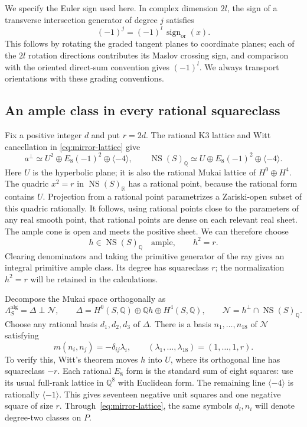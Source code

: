 \documentclass[11pt]{article}
\numberwithin{equation}{section}
\theoremstyle{definition}
\theoremstyle{remark}
\begin{document}
We specify the Euler sign used here.  In complex dimension $2l$, the sign of
a transverse intersection generator of degree $j$ satisfies
\begin{equation}\label{eq:euler-intersection-sign}
 (-1)^j=(-1)^l\,\operatorname{sign}_{\mathrm{or}}(x).
\end{equation}
This follows by rotating the graded tangent planes to coordinate planes;
each of the $2l$ rotation directions contributes its Maslov crossing sign,
and comparison with the oriented direct-sum convention gives $(-1)^l$.
We always transport orientations with these grading conventions.

\subsection{An ample class in every rational squareclass}

Fix a positive integer $d$ and put $r=2d$.  The rational K3 lattice and Witt cancellation in
\eqref{eq:mirror-lattice} give
\[
 a^\perp\simeq U^2\oplus E_8(-1)^2\oplus\langle-4\rangle,
 \qquad
 \operatorname{NS}(S)_\mathbb Q\simeq U\oplus E_8(-1)^2\oplus\langle-4\rangle.
\]
Here $U$ is the hyperbolic plane; it is also the rational Mukai lattice of
$H^0\oplus H^4$.  The quadric $x^2=r$ in $\operatorname{NS}(S)_\mathbb R$ has a rational point,
because the rational form contains $U$.  Projection from a rational point
parametrizes a Zariski-open subset of this quadric rationally.  It follows,
using rational points close to the parameters of any real smooth point,
that rational points are dense on each relevant real sheet.  The ample cone
is open and meets the positive sheet.  We can therefore choose
\[
 h\in\operatorname{NS}(S)_\mathbb Q\quad\text{ample},\qquad h^2=r.
\]
Clearing denominators and taking the primitive generator of the ray gives
an integral primitive ample class.  Its degree has squareclass $r$; the
normalization $h^2=r$ will be retained in the calculations.

Decompose the Mukai space orthogonally as
\begin{equation}\label{eq:delta-negative}
 \Lambda_S^{\mathrm{alg}}=\Delta\mathbin{\perp}\mathcal N,
 \qquad
 \Delta=H^0(S,\mathbb Q)\oplus\mathbb Q h\oplus H^4(S,\mathbb Q),\qquad
 \mathcal N=h^\perp\cap\operatorname{NS}(S)_\mathbb Q.
\end{equation}
Choose any rational basis $d_1,d_2,d_3$ of $\Delta$.  There is a basis
$n_1,\ldots,n_{18}$ of $\mathcal N$ satisfying
\begin{equation}\label{eq:negative-basis}
 m(n_i,n_j)=-\delta_{ij}\lambda_i,
 \qquad (\lambda_1,\ldots,\lambda_{18})=(1,\ldots,1,r).
\end{equation}
To verify this, Witt's theorem moves $h$ into $U$, where its orthogonal
line has squareclass $-r$.  Each rational $E_8$ form is the standard sum of
eight squares: use its usual full-rank lattice in $\mathbb Q^8$ with Euclidean
form.  The remaining line $\langle-4\rangle$ is rationally
$\langle-1\rangle$.  This gives seventeen negative unit squares and one
negative square of size $r$.  Through~\eqref{eq:mirror-lattice}, the same
symbols $d_l,n_i$ will denote degree-two classes on $P$.
\end{document}

